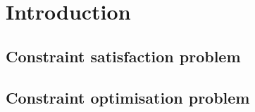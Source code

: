 \documentclass[CS4402-Notes.tex]{subfiles}
\begin{document}
\section{Introduction}

\subsection{Constraint satisfaction problem}

\subsection{Constraint optimisation problem}
\end{document}

